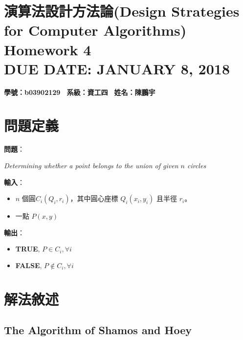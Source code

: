 \documentclass[15pt]{extarticle}
\begin{document}
 
\fontsize{12pt}{12pt}\selectfont
\thispagestyle{empty}
\section*{演算法設計方法論(Design Strategies for Computer Algorithms) \\
\normalsize{Homework 4} \\
\normalsize{DUE DATE: JANUARY 8, 2018}}

\hfill \textbf{學號：b03902129 \, 系級：資工四 \, 姓名：陳鵬宇} \\

\section{問題定義}

\vskip3mm
\textbf{問題}：\begin{minipage}[t]{0.8\linewidth}
    \textit{Determining whether a point belongs to the union of given $n$ circles} \vskip0mm
\end{minipage}
\vskip3mm
\textbf{輸入}：
\begin{minipage}[t]{0.8\linewidth}
\begin{itemize}
    \item $n$ 個圓$C_i(Q_i,r_i)$，其中圓心座標 $Q_i(x_i,y_i)$ 且半徑 $r_i$。
    \item 一點 $P(x,y)$
\end{itemize}
\end{minipage}

\vskip3mm
\textbf{輸出}：
\begin{minipage}[t]{0.8\linewidth}
    \begin{itemize}
        \item \textbf{TRUE}, $P\in C_i,\forall i$
        \item \textbf{FALSE}, $P\notin C_i,\forall i$
    \end{itemize}
\end{minipage}


\section{解法敘述}
\subsection{The Algorithm of Shamos and Hoey}
\end{document}
